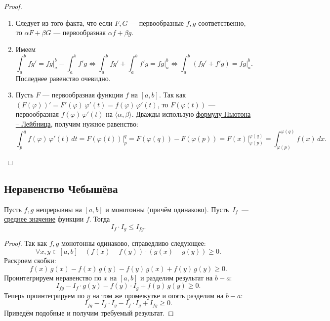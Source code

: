 \begin{proof}
	\begin{enumerate}
		\item Следует из того факта, что если $F, G$ --- первообразные $f, g$ соответственно, то $\alpha F + \beta G$ --- первообразная $\alpha f + \beta g$.
		\item Имеем \[
			\int_a^b fg' = fg \bigg|_a^b - \int_a^b f'g \iff \int_a^b fg' + \int_a^b f'g = fg \bigg|_a^b \iff \int_a^b (fg' + f'g) = fg \bigg|_a^b.
		\]
		Последнее равенство очевидно.
		\item Пусть $F$ --- первообразная функции $f$ на $[a, b]$. Так как \((F(\varphi))' = F'(\varphi) \, \varphi'(t) = f(\varphi) \, \varphi'(t)\), то
		$F(\varphi(t))$ --- первообразная $f(\varphi) \, \varphi'(t)$ на $\langle \alpha, \beta \rangle$.
		Дважды использую \hyperlink{t9}{формулу Ньютона -- Лейбница}, получим нужное равенство: \[
			\int_p^q f(\varphi) \, \varphi'(t) \, dt = F(\varphi(t)) \bigg|_p^q = F(\varphi(q)) - F(\varphi(p)) = F(x) \bigg|_{\varphi(p)}^{\varphi(q)} = \int_{\varphi(p)}^{\varphi(q)} f(x) \, dx.
		\]
	\end{enumerate}
\end{proof}

\subsection{Неравенство Чебышёва}

\begin{theorem}
	Пусть \(f, g\) непрерывны на \([a, b]\) и монотонны (причём одинаково). Пусть~\(I_f\)~--- \hyperlink{average}{среднее значение} функции \(f\). Тогда \[
	I_f \cdot I_g \leqslant I_{fg}.
	\]
\end{theorem}

\begin{proof}
	Так как \(f, g\) монотонны одинаково, справедливо следующее: \[
	\forall x, y \in [a, b] \quad (f(x) - f(y)) \cdot (g(x) - g(y)) \geqslant 0.
	\]
	Раскроем скобки: \[
	f(x)\,g(x) - f(x)\,g(y) - f(y)\,g(x) + f(y)\,g(y) \geqslant 0.
	\]
	Проинтегрируем неравенство по \(x\) на \([a, b]\) и разделим результат на \(b - a\): \[
	I_{fg} - I_f \cdot g(y) - f(y) \cdot I_g + f(y)\,g(y) \geqslant 0.
	\]
	Теперь проинтегрируем по \(y\) на том же промежутке и опять разделим на \(b - a\): \[
	I_{fg} - I_f \cdot I_g - I_f \cdot I_g + I_{fg} \geqslant 0.
	\]
	Приведём подобные и получим требуемый результат.
\end{proof}

